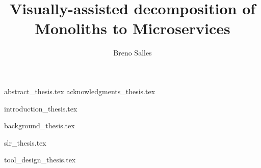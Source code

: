 \documentclass[11pt,a4paper]{report}
\begin{document}
\title{Visually-assisted decomposition of Monoliths to Microservices}

\author{Breno Salles}










\begin{Prolog}
  {abstract_thesis.tex}
  {acknowledgments_thesis.tex}
  \cleardoublepage
  \tableofcontents
  \cleardoublepage
  \listoffigures
  \cleardoublepage
  \listoftables
  \cleardoublepage
\end{Prolog}

\StartBody

{introduction_thesis.tex}

{background_thesis.tex}

{slr_thesis.tex}

{tool_design_thesis.tex}
\end{document}

